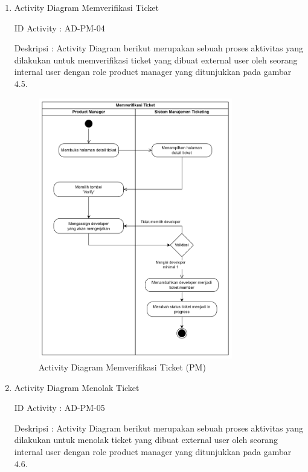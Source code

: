 \documentclass[12pt]{article}
\begin{document}
\begin{enumerate}[label=\textbf{4.\arabic*.}]
\begin{enumerate} [label=\textbf{4.2.\arabic*.}, wide, labelwidth=!, labelindent=0pt]
\begin{enumerate}[label=\textbf{4.2.1.\arabic*.}, wide, labelwidth=!, labelindent=0pt]
\begin{enumerate}[label=\arabic*.,wide,labelindent=27pt]
                \item Activity Diagram Memverifikasi Ticket

                \noindent ID Activity	: AD-PM-04

                \noindent Deskripsi	: Activity Diagram berikut merupakan sebuah proses aktivitas yang dilakukan untuk memverifikasi ticket yang dibuat external user oleh seorang  internal user dengan role product manager yang ditunjukkan pada gambar 4.5.


                \begin{figure}[H]
                    \centering \includegraphics[width=0.8\textwidth]{images/activity/ipm/Memverifikasi Ticket.png}
                    \caption{Activity Diagram Memverifikasi Ticket (PM)}
                    \label{fig:AD-PM-04}
                \end{figure}


                \item Activity Diagram Menolak Ticket

                \noindent ID Activity	: AD-PM-05

                \noindent Deskripsi	: Activity Diagram berikut merupakan sebuah proses aktivitas yang dilakukan untuk menolak ticket yang dibuat external user oleh seorang  internal user dengan role product manager yang ditunjukkan pada gambar 4.6.



\end{enumerate}
\end{enumerate}
\end{enumerate}
\end{enumerate}
\end{document}
